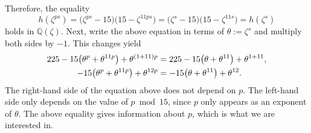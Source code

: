 \documentclass[a4paper, 12pt]{article}
\theoremstyle{definition}
\newcommand{\Q}{\ensuremath{\mathbb{Q}}}
\begin{document}
Therefore, the equality
\begin{equation*}
h(\zeta^{ps})=\big(\zeta^{ps}-15\big)\big({15}-\zeta^{11ps}\big)=\big(\zeta^{s}-15\big)\big({15}-\zeta^{11s}\big)=h(\zeta^{s})
\end{equation*}
holds in $\Q(\zeta)$. Next, write the above equation in terms of $\theta:=\zeta^{s}$ and multiply both sides by $-1$. This changes yield
\begin{align}
225-{15}\big(\theta^{p}+\theta^{11p}\big)+\theta^{(1+11)p}&=225-{15}\big(\theta+\theta^{11}\big)+\theta^{1+11}, \notag \\
-15\big(\theta^{p}+\theta^{11p}\big)+\theta^{12p}&=-15\big(\theta+\theta^{11}\big)+\theta^{12}\label{eq:equality_in_theta}.
\end{align}
The right-hand side of the equation above does not depend on $p$. The left-hand side only depends on the value of $p\bmod{15}$, since $p$ only appears as an exponent of $\theta$. The above equality gives information about $p$, which is what we are interested in. 
\end{document}
